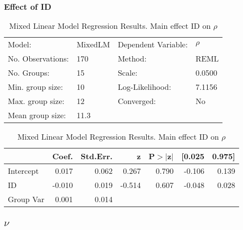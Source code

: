 \documentclass{article}
\begin{document}
\subsubsection{Effect of ID}
\begin{table}
    \caption{Mixed Linear Model Regression Results. Main effect ID on $\rho$}
    \label{}
    \begin{center}
    \begin{tabular}{llll}
    \hline
    Model:            & MixedLM & Dependent Variable: & $\rho$  \\
    No. Observations: & 170     & Method:             & REML     \\
    No. Groups:       & 15      & Scale:              & 0.0500   \\
    Min. group size:  & 10      & Log-Likelihood:     & 7.1156   \\
    Max. group size:  & 12      & Converged:          & No       \\
    Mean group size:  & 11.3    &                     &          \\
    \hline
    \end{tabular}
    \end{center}
    
    \begin{center}
    \begin{tabular}{lrrrrrr}
    \hline
              &  Coef. & Std.Err. &      z & P$> |$z$|$ & [0.025 & 0.975]  \\
    \hline
    Intercept &  0.017 &    0.062 &  0.267 &       0.790 & -0.106 &  0.139  \\
    ID        & -0.010 &    0.019 & -0.514 &       0.607 & -0.048 &  0.028  \\
    Group Var &  0.001 &    0.014 &        &             &        &         \\
    \hline
    \end{tabular}
    \end{center}
    \end{table}

\subsection{$\nu$}
\end{document}
